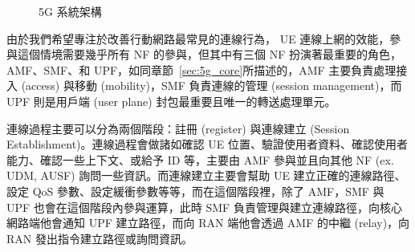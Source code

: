 \begin{figure}[ht]
  \centering
  \caption[5G 系統架構]{{\footnotesize 5G 系統架構~\cite{3gpp.23.501}}}
  \label{fig:5g_system_architecture}
\end{figure}

由於我們希望專注於改善行動網路最常見的連線行為， UE 連線上網的效能，參與這個情境需要幾乎所有 NF 的參與，但其中有三個 NF 扮演著最重要的角色，AMF、SMF、和 UPF，如同章節~\ref{sec:5g_core}所描述的，AMF 主要負責處理接入 (access) 與移動 (mobility)，SMF 負責連線的管理 (session management)，而 UPF 則是用戶端 (user plane) 封包最重要且唯一的轉送處理單元。

連線過程主要可以分為兩個階段：註冊 (register) 與連線建立 (Session Establishment)。連線過程會做諸如確認 UE 位置、驗證使用者資料、確認使用者能力、確認一些上下文、或給予 ID 等，主要由 AMF 參與並且向其他 NF (ex. UDM, AUSF) 詢問一些資訊。而連線建立主要會幫助 UE 建立正確的連線路徑、設定 QoS 參數、設定緩衝參數等等，而在這個階段裡，除了 AMF，SMF 與 UPF 也會在這個階段內參與運算，此時 SMF 負責管理與建立連線路徑，向核心網路端他會通知 UPF 建立路徑，而向 RAN 端他會透過 AMF 的中繼 (relay)，向 RAN 發出指令建立路徑或詢問資訊。


